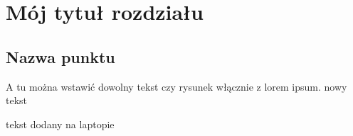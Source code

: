 \chapter{Mój tytuł rozdziału}
\section{Nazwa punktu}

A tu można wstawić dowolny tekst czy rysunek włącznie z lorem ipsum.
nowy tekst

tekst dodany na laptopie